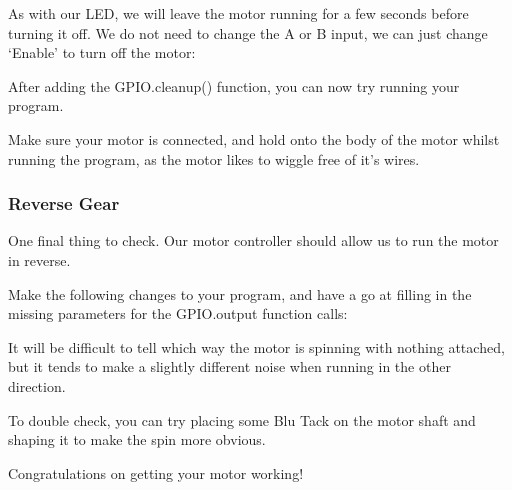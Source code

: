 		As with our LED, we will leave the motor running for a few seconds before turning it off. We do not need to change the A or B input, we can just change `Enable' to turn off the motor:
		
		
		
		After adding the GPIO.cleanup() function, you can now try running your program.
		
		Make sure your motor is connected, and hold onto the body of the motor whilst running the program, as the motor likes to wiggle free of it's wires.
		
		\subsubsection*{Reverse Gear}
		
			One final thing to check. Our motor controller should allow us to run the motor in reverse. 
			
			Make the following changes to your program, and have a go at filling in the missing parameters for the GPIO.output function calls:
					
			
			
			It will be difficult to tell which way the motor is spinning with nothing attached, but it tends to make a slightly different noise when running in the other direction.
			
			To double check, you can try placing some Blu Tack on the motor shaft and shaping it to make the spin more obvious.
			
			Congratulations on getting your motor working!
			